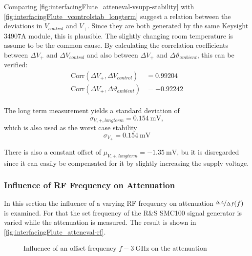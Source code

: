 Comparing \autoref{fig:interfacingFlute_atteneval-vsupp-stability} with \autoref{fig:interfacingFlute_vcontrolstab_longterm} suggest a relation between the deviations in $V_{control}$ and $V_+$. Since they are both generated by the same Keysight 34907A module, this is plausible. The slightly changing room temperature is assume to be the common cause.
By calculating the correlation coefficients between $\Delta V_+$ and $\Delta V_{control}$ and also between $\Delta V_+$ and $\Delta \vartheta_{ambient}$, this can be verified:
\begin{align}
\text{Corr}(\Delta V_+,\Delta V_{control})         &= \num{0.99204} \\
\text{Corr}(\Delta V_+,\Delta \vartheta_{ambient}) &= \num{-0.92242} \\
\end{align}

The long term measurement yields a standard deviation of
\begin{equation}
\sigma_{V,+,longterm} = \SI{0.154}{\milli\volt},
\end{equation}
which is also used as the worst case stability
\begin{equation}
\sigma_{V_+} = \SI{0.154}{\milli\volt}
\end{equation}

There is also a constant offset of $\mu_{V,+,longterm}=\SI{-1.35}{\milli\volt}$, bu it is disregarded since it can easily be compensated for it by slightly increasing the supply voltage.

\subsubsection{Influence of RF Frequency on Attenuation}
In this section the influence of a varying RF frequency on attenuation $\nicefrac{\Delta A}{\Delta f} (f)$ is examined. For that the set frequency of the R\&S SMC100 signal generator is varied while the attenuation is measured. The result is shown in \autoref{fig:interfacingFlute_atteneval-rf}.

\begin{figure}[tb]
    \centering
        \subfloat[$f=f_o \SI{+-30}{\kHz}$]{}
        \qquad
        \subfloat[$f=f_o \SI{+-1}{\kHz}$]{}
       \caption{Influence of an offset frequency $f-\SI{3}{\GHz}$ on the attenuation }
    \label{fig:interfacingFlute_atteneval-rf}
\end{figure}

